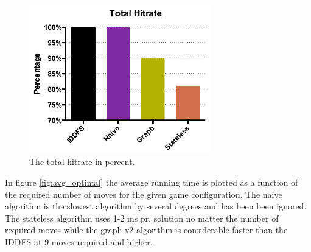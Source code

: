 \documentclass[]{article}
\begin{document}
\begin{figure}[htb]
\centering
\includegraphics[height=0.25\textheight,width=0.7\textwidth,keepaspectratio]{img/total_hitrate.pdf}
\caption{The total hitrate in percent.}
\label{fig:total_hitrate}
\end{figure}

In figure \ref{fig:avg_optimal} the average running time is plotted as a
function of the required number of moves for the given game
configuration. The naive algorithm is the slowest algorithm by several
degrees and has been been ignored. The stateless algorithm uses 1-2 ms
pr. solution no matter the number of required moves while the graph v2
algorithm is considerable faster than the IDDFS at 9 moves required and
higher.
\end{document}
